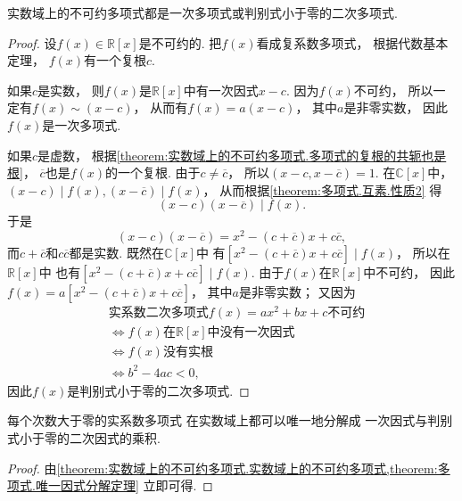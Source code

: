 \begin{theorem}\label{theorem:实数域上的不可约多项式.实数域上的不可约多项式}
实数域上的不可约多项式都是一次多项式或判别式小于零的二次多项式.
\begin{proof}
设\(f(x)\in\mathbb{R}[x]\)是不可约的.
把\(f(x)\)看成复系数多项式，
根据代数基本定理，
\(f(x)\)有一个复根\(c\).

如果\(c\)是实数，
则\(f(x)\)是\(\mathbb{R}[x]\)中有一次因式\(x-c\).
因为\(f(x)\)不可约，
所以一定有\(f(x) \sim (x-c)\)，
从而有\(f(x)=a(x-c)\)，
其中\(a\)是非零实数，
因此\(f(x)\)是一次多项式.

如果\(c\)是虚数，
根据\cref{theorem:实数域上的不可约多项式.多项式的复根的共轭也是根}，
\(\overline{c}\)也是\(f(x)\)的一个复根.
由于\(c\neq\overline{c}\)，
所以\((x-c,x-\overline{c})=1\).
在\(\mathbb{C}[x]\)中，
\((x-c) \mid f(x),
(x-\overline{c}) \mid f(x)\)，
从而根据\cref{theorem:多项式.互素.性质2} 得\begin{equation*}
	(x-c)(x-\overline{c}) \mid f(x).
\end{equation*}
于是\begin{equation*}
	(x-c)(x-\overline{c})
	=x^2-(c+\overline{c})x+c\overline{c},
\end{equation*}
而\(c+\overline{c}\)和\(c\overline{c}\)都是实数.
既然在\(\mathbb{C}[x]\)中
有\([x^2-(c+\overline{c})x+c\overline{c}] \mid f(x)\)，
所以在\(\mathbb{R}[x]\)中
也有\([x^2-(c+\overline{c})x+c\overline{c}] \mid f(x)\).
由于\(f(x)\)在\(\mathbb{R}[x]\)中不可约，
因此\(f(x)=a[x^2-(c+\overline{c})x+c\overline{c}]\)，
其中\(a\)是非零实数；
又因为\begin{align*}
	&\text{实系数二次多项式$f(x)=ax^2+bx+c$不可约} \\
	&\iff \text{$f(x)$在$\mathbb{R}[x]$中没有一次因式} \\
	&\iff \text{$f(x)$没有实根} \\
	&\iff b^2-4ac<0,
\end{align*}
因此\(f(x)\)是判别式小于零的二次多项式.
\end{proof}
\end{theorem}

\begin{theorem}[实系数多项式唯一因式分解定理]
每个次数大于零的实系数多项式
在实数域上都可以唯一地分解成
一次因式与判别式小于零的二次因式的乘积.
\begin{proof}
由\cref{theorem:实数域上的不可约多项式.实数域上的不可约多项式,theorem:多项式.唯一因式分解定理}
立即可得.
\end{proof}
\end{theorem}
